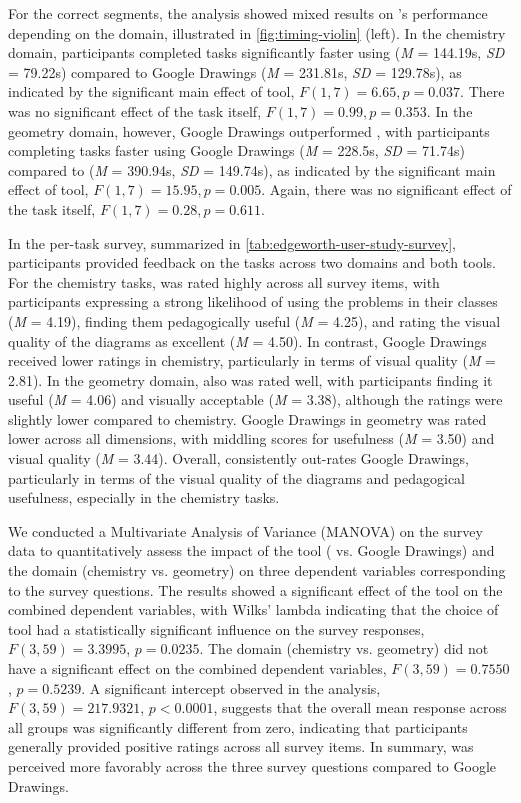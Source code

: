 For the correct segments, the analysis showed mixed results on \Penrose's performance depending on the domain, illustrated in \cref{fig:timing-violin} (left). In the chemistry domain, participants completed tasks significantly faster using \Penrose (\textit{M} = 144.19s, \textit{SD} = 79.22s) compared to Google Drawings (\textit{M} = 231.81s, \textit{SD} = 129.78s), as indicated by the significant main effect of tool, $F(1, 7) = 6.65, p = 0.037$. There was no significant effect of the task itself, $F(1, 7) = 0.99, p = 0.353$. In the geometry domain, however, Google Drawings outperformed \Penrose, with participants completing tasks faster using Google Drawings (\textit{M} = 228.5s, \textit{SD} = 71.74s) compared to \Penrose (\textit{M} = 390.94s, \textit{SD} = 149.74s), as indicated by the significant main effect of tool, $F(1, 7) = 15.95, p = 0.005$. Again, there was no significant effect of the task itself, $F(1, 7) = 0.28, p = 0.611$.


In the per-task survey, summarized in \cref{tab:edgeworth-user-study-survey}, participants provided feedback on the tasks across two domains and both tools. For the chemistry tasks, \Edgeworth was rated highly across all survey items, with participants expressing a strong likelihood of using the problems in their classes (\textit{M} = 4.19), finding them pedagogically useful (\textit{M} = 4.25), and rating the visual quality of the diagrams as excellent (\textit{M} = 4.50). In contrast, Google Drawings received lower ratings in chemistry, particularly in terms of visual quality (\textit{M} = 2.81). In the geometry domain, \Edgeworth also was rated well, with participants finding it useful (\textit{M} = 4.06) and visually acceptable (\textit{M} = 3.38), although the ratings were slightly lower compared to chemistry. Google Drawings in geometry was rated lower across all dimensions, with middling scores for usefulness (\textit{M} = 3.50) and visual quality (\textit{M} = 3.44). Overall, \Edgeworth consistently out-rates Google Drawings, particularly in terms of the visual quality of the diagrams and pedagogical usefulness, especially in the chemistry tasks.


We conducted a Multivariate Analysis of Variance (MANOVA) on the survey data to quantitatively assess the impact of the tool (\Edgeworth{} vs. Google Drawings) and the domain (chemistry vs. geometry) on three dependent variables corresponding to the survey questions. The results showed a significant effect of the tool on the combined dependent variables, with Wilks' lambda indicating that the choice of tool had a statistically significant influence on the survey responses, $F(3, 59) = 3.3995$, $p = 0.0235$. The domain (chemistry vs. geometry) did not have a significant effect on the combined dependent variables, $F(3, 59) = 0.7550$, $p = 0.5239$. A significant intercept observed in the analysis, $F(3, 59) = 217.9321$, $p < 0.0001$, suggests that the overall mean response across all groups was significantly different from zero, indicating that participants generally provided positive ratings across all survey items. In summary, \Edgeworth{} was perceived more favorably across the three survey questions compared to Google Drawings.


